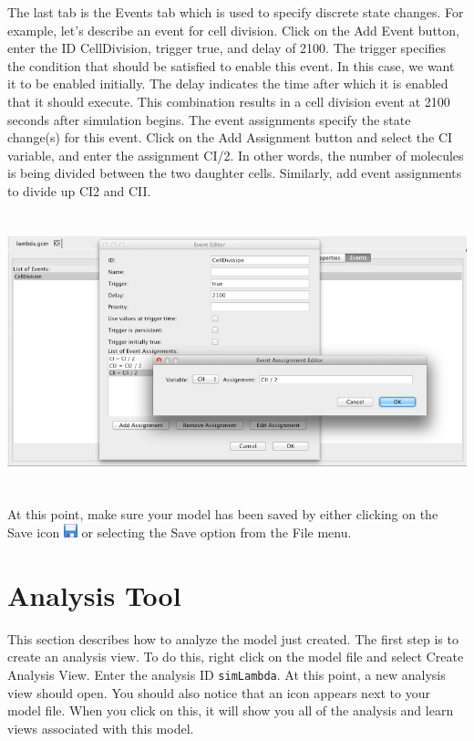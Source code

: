 \documentclass[titlepage,11pt]{article}
\begin{document}
The last tab is the Events tab which is used to specify discrete state changes.  For example, let's describe an event for cell division.  Click on the Add Event button, enter the ID CellDivision, trigger true, and delay of 2100.  The trigger specifies the condition that should be satisfied to enable this event.  In this case, we want it to be enabled initially.  The delay indicates the time after which it is enabled that it should execute.  This combination results in a cell division event at 2100 seconds after simulation begins.  The event assignments specify the state change(s) for this event.  Click on the Add Assignment button and select the CI variable, and enter the assignment CI/2.  In other words, the number of molecules is being divided between the two daughter cells.  Similarly, add event assignments to divide up CI2 and CII.

\begin{center}
\includegraphics[height=80mm]{screenshots/event}
\end{center}

At this point, make sure your model has been saved by either clicking on the Save icon \includegraphics{../gui/icons/save} or selecting the Save option from the File menu.

\section{Analysis Tool}

This section describes how to analyze the model just created.  The first step is to create an analysis view.  To do this, right click on the model file and select Create Analysis View.  Enter the analysis ID {\tt simLambda}.  At this point, a new analysis view should open.  You should also notice that an icon appears next to your model file.  When you click on this, it will show you all of the analysis and learn views associated with this model.
\end{document}
